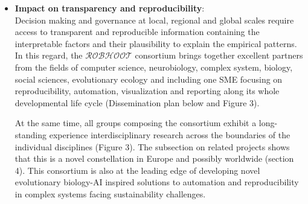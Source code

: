 \documentclass[11pt, a4paper]{article} %
\begin{document}
\begin{itemize}
\item {\bf Impact on transparency and reproducibility}:\\
  Decision making and governance at local, regional and global scales
  require access to transparent and reproducible information
  containing the interpretable factors and their plausibility to
  explain the empirical patterns. In this regard, the
  $\mathcal{ROBHOOT}$ consortium brings together excellent partners
  from the fields of computer science, neurobiology, complex system,
  biology, social sciences, evolutionary ecology and including one SME
  focusing on reproducibility, automation, visualization and reporting
  along its whole developmental life cycle (Dissemination plan below
  and Figure 3).


  At the same time, all groups composing the consortium
  exhibit a long-standing experience interdisciplinary research across
  the boundaries of the individual disciplines (Figure 3). The
  subsection on related projects shows that this is a novel
  constellation in Europe and possibly worldwide (section 4). This
  consortium is also at the leading edge of developing novel
  evolutionary biology-AI inspired solutions to automation and
  reproducibility in complex systems facing sustainability challenges.
  

\end{itemize}
\end{document}
